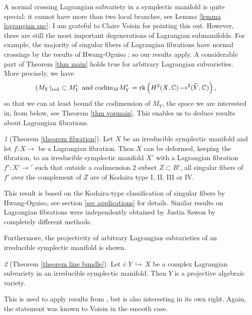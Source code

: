 \documentclass[a4paper,11pt,final]{amsart}
\theoremstyle{plain}
\theoremstyle{definition}
\numberwithin{equation}{section}
\theoremstyle{remark}
\newtheorem*{custom}{}}
\begin{document}
A normal crossing Lagrangian subvariety in a symplectic manifold is quite special: it cannot have more than two local branches, see Lemma \ref{lemma lagrangian snc}. I am grateful to Claire Voisin for pointing this out. However, these are still the most important degenerations of Lagrangian submanifolds. For example, the majority of singular fibers of Lagrangian fibrations have normal crossings by the results of Hwang-Oguiso \cite{HO07}; so our results apply. A considerable part of Theorem \ref{thm main} holds true for arbitrary Lagrangian subvarieties. More precisely, we have
\[
(M_Y)_{{\operatorname{red}}} \subset M_Y' \textrm{ and } {\operatorname{codim}}_M M'_Y = {{\rm rk}}\left(H^2(X,{{\mathbb C}}) {\xrightarrow{\ \ }}^2({{\widetilde{Y}}},{{\mathbb C}})\right),
\]
so that we can at least bound the codimension of $M_Y$, the space we are interested in, from below, see Theorem \ref{thm vormain}. This enables us to deduce results about Lagrangian fibrations.
\begin{custom}[Theorem \ref{theorem fibration}]
Let $X$ be an irreducible symplectic manifold and let $f:X{\xrightarrow{\ \ }}$ be a Lagrangian fibration. Then $X$ can be deformed, keeping the fibration, to an irreducible symplectic manifold $X'$ with a Lagrangian fibration $f':X'{\xrightarrow{\ \ }}'$ such that outside a codimension $2$ subset $Z\subset B'$, all singular fibers of $f'$ over the complement of $Z$ are of Kodaira type I, II, III or IV.
\end{custom}
This result is based on the Kodaira-type classification of singular fibers by Hwang-Oguiso, see section \ref{sec applications} for details. Similar results on Lagrangian fibrations were independently obtained by Justin Sawon \cite{Sa15} by completely different methods. 

Furthermore, the projectivity of arbitrary Lagrangian subvarieties of an irreducible symplectic manifold is shown. 
\begin{custom}[Theorem \ref{theorem line bundle}]
Let $i: Y {{\, \hookrightarrow\,}} X$ be a complex Lagrangian subvariety in an irreducible symplectic manifold. Then $Y$ is a projective algebraic variety.
\end{custom}

This is used to apply results from \cite{CL12}, but is also interesting in its own right. Again, the statement was known to Voisin in the smooth case.
\end{document}
